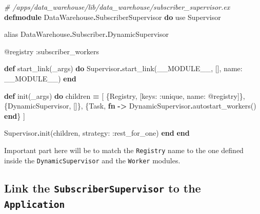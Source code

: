 \documentclass[
]{book}
\newenvironment{Shaded}{\begin{snugshade}}{\end{snugshade}}
\newcommand{\CommentTok}[1]{\textcolor[rgb]{0.56,0.35,0.01}{\textit{#1}}}
\newcommand{\ConstantTok}[1]{\textcolor[rgb]{0.00,0.00,0.00}{#1}}
\newcommand{\ImportTok}[1]{#1}
\newcommand{\KeywordTok}[1]{\textcolor[rgb]{0.13,0.29,0.53}{\textbf{#1}}}
\newcommand{\NormalTok}[1]{#1}
\newcommand{\OperatorTok}[1]{\textcolor[rgb]{0.81,0.36,0.00}{\textbf{#1}}}
\newcommand{\OtherTok}[1]{\textcolor[rgb]{0.56,0.35,0.01}{#1}}
\newcommand{\VariableTok}[1]{\textcolor[rgb]{0.00,0.00,0.00}{#1}}
\begin{document}
\begin{Shaded}
\begin{Highlighting}[]
\CommentTok{\# /apps/data\_warehouse/lib/data\_warehouse/subscriber\_supervisor.ex}
\KeywordTok{defmodule} \ConstantTok{DataWarehouse}\OperatorTok{.}\ConstantTok{SubscriberSupervisor} \KeywordTok{do}
  \ImportTok{use} \ConstantTok{Supervisor}

  \ImportTok{alias} \ConstantTok{DataWarehouse}\OperatorTok{.}\ConstantTok{Subscriber}\OperatorTok{.}\ConstantTok{DynamicSupervisor}

  \OtherTok{@registry} \VariableTok{:subscriber\_workers}

  \KeywordTok{def}\NormalTok{ start\_link(\_args) }\KeywordTok{do}
    \ConstantTok{Supervisor}\OperatorTok{.}\NormalTok{start\_link(}\ConstantTok{\_\_MODULE\_\_}\NormalTok{, [], }\VariableTok{name:} \ConstantTok{\_\_MODULE\_\_}\NormalTok{)}
  \KeywordTok{end}

  \KeywordTok{def}\NormalTok{ init(\_args) }\KeywordTok{do}
\NormalTok{    children }\OperatorTok{=}\NormalTok{ [}
\NormalTok{      \{}\ConstantTok{Registry}\NormalTok{, [}\VariableTok{keys:} \VariableTok{:unique}\NormalTok{, }\VariableTok{name:} \OtherTok{@registry}\NormalTok{]\},}
\NormalTok{      \{}\ConstantTok{DynamicSupervisor}\NormalTok{, []\},}
\NormalTok{      \{}\ConstantTok{Task}\NormalTok{,}
       \KeywordTok{fn} \OperatorTok{{-}\textgreater{}}
         \ConstantTok{DynamicSupervisor}\OperatorTok{.}\NormalTok{autostart\_workers()}
       \KeywordTok{end}\NormalTok{\}}
\NormalTok{    ]}

    \ConstantTok{Supervisor}\OperatorTok{.}\NormalTok{init(children, }\VariableTok{strategy:} \VariableTok{:rest\_for\_one}\NormalTok{)}
  \KeywordTok{end}
\KeywordTok{end}
\end{Highlighting}
\end{Shaded}

Important part here will be to match the \texttt{Registry} name to the one defined inside the \texttt{DynamicSupervisor} and the \texttt{Worker} modules.

\hypertarget{link-the-subscribersupervisor-to-the-application}{%
\subsection{\texorpdfstring{Link the \texttt{SubscriberSupervisor} to the \texttt{Application}}{Link the SubscriberSupervisor to the Application}}\label{link-the-subscribersupervisor-to-the-application}}
\end{document}
